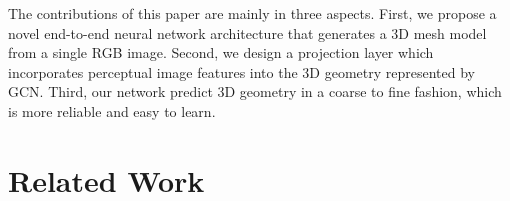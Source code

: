 \documentclass[runningheads]{llncs}
\begin{document}
The contributions of this paper are mainly in three aspects.
First, we propose a novel end-to-end neural network architecture that generates a 3D mesh model from a single RGB image.
Second, we design a projection layer which incorporates perceptual image features into the 3D geometry represented by GCN.
Third, our network predict 3D geometry in a coarse to fine fashion, which is more reliable and easy to learn.




























\iffalse
3D modelling is important

Deep learning for 3D is a trend.

Mesh representation is better than 3D volumetric representation/point cloud representation.

In this paper, we develop a model for direct mesh reconstruction from single images. Our model is a coarse-to-fine graph convolutional neural network (G-CNN) trained in a supervised fashion on pairs of images and meshes. Starting from a initial sparse mesh such as an ellipsoid centered at the object center, our model is able to recover a dense mesh with fine-grained details. The stronger representation power of meshes helps to reconstruct high-quality 3D object with moderate memory cost; the coarse-to-fine framework grabs global structure at lower layers such that our model is capable of transforming the simple initial mesh to capture the shape of object; and then our model progressively densify the mesh and add details to it in the higher layers. 


As far as we know, we are the first to directly construct meshes from single images by deep learning. We evaluate on ..., and we are the best.

\fi

 
\section{Related Work}
\label{sec:related}
\end{document}
